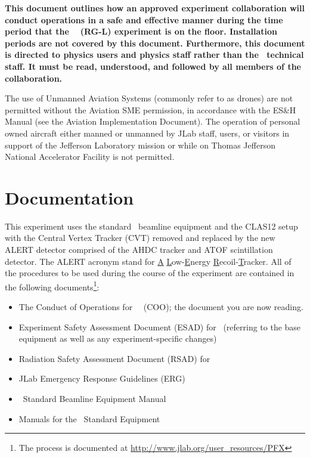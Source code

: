 \documentclass[11pt]{article}
\begin{document}
{\bf This document outlines how an approved experiment collaboration will conduct
operations in a safe and effective manner during the time period that the 
\EXPTS\  %
(RG-L) experiment is on the floor. Installation periods are not covered by this
document. Furthermore, this document is directed to physics users and
physics staff rather than the \HALL\ technical staff. It must be read, 
understood, and followed by all members of the collaboration. }

The use of Unmanned Aviation Systems (commonly refer to as drones) are not permitted
without the Aviation SME permission, in accordance with the ES\&H Manual (see the
Aviation Implementation Document). The operation of personal owned aircraft either
manned or unmanned by JLab staff, users, or visitors in support of the Jefferson
Laboratory mission or while on Thomas Jefferson National Accelerator Facility is not
permitted.

\section{Documentation}
\indent

This experiment uses the standard \HALL\ beamline equipment and the CLAS12 setup with
the Central Vertex Tracker (CVT) removed and replaced by the new ALERT detector comprised
of the AHDC tracker and ATOF scintillation detector. The ALERT acronym stand for \underline{A}
\underline{L}ow-\underline{E}nergy \underline{R}ecoil-\underline{T}racker. All of the procedures
to be used during the course of the experiment are contained in the following
documents\footnote{The process is documented at \url{http://www.jlab.org/user_resources/PFX} }:

\begin{itemize}

\item  The Conduct of Operations for \HALL\ \EXPTS\
 (COO); the document you are now reading. 

\item   Experiment Safety Assessment Document (ESAD)
for \EXPTS\ (referring to the base equipment as well as any 
experiment-specific changes)

\item Radiation Safety Assessment Document (RSAD) for \EXPTS\

\item JLab Emergency Response Guidelines (ERG) 

\item \HALL\ Standard Beamline Equipment Manual 

\item Manuals for the \EXPTSabrev\ Standard Equipment 

\end{itemize}
\end{document}
